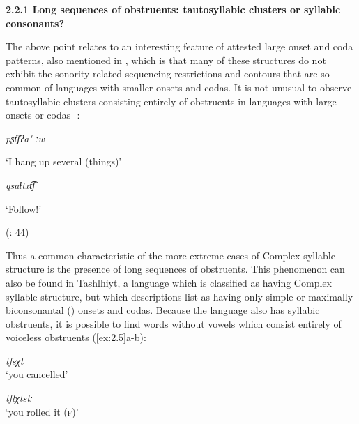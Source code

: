 \textbf{2.2.1 Long sequences of obstruents: tautosyllabic clusters or syllabic consonants?}

  The above point relates to an interesting feature of attested large onset and coda patterns, also mentioned in , which is that many of these structures do not exhibit the sonority-related sequencing restrictions and contours that are so common of languages with smaller onsets and codas. It is not unusual to observe tautosyllabic clusters consisting entirely of obstruents in languages with large onsets or codas -:

\ea\label{ex:2.3}

  \textit{pʂt͡ʃʔa\'{} ːw}

  ‘I hang up several (things)’

  \citep[36]{Crawford1966}
\z

\ea\label{ex:2.4}

  \textit{qsaɬtxt͡ʃ}

  ‘Follow!’

  (\citealt{GeorgVolodin1999}: 44)
\z

  Thus a common characteristic of the more extreme cases of Complex syllable structure is the presence of long sequences of obstruents. This phenomenon can also be found in Tashlhiyt, a language which is classified as having Complex syllable structure, but which descriptions list as having only simple \citep{Ridouane2008} or maximally biconsonantal (\citealt{PuechLouali1999}) onsets and codas. Because the language also has syllabic obstruents, it is possible to find words without vowels which consist entirely of voiceless obstruents (\ref{ex:2.5}a-b):

\ea\label{ex:2.5}
\ea  \textit{tfsχt}\\
\glt ‘you cancelled’

\ex  \textit{tftχtstː}\\
\glt ‘you rolled it (\textsc{f})’

  \citep[95]{Ridouane2002}
\z
\z

